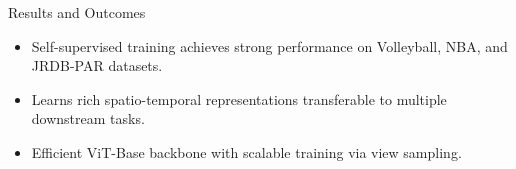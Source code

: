 \documentclass{beamer}
\begin{document}
\begin{frame}{Results and Outcomes}
    \begin{itemize}
        \item Self-supervised training achieves strong performance on Volleyball, NBA, and JRDB-PAR datasets.
        \item Learns rich spatio-temporal representations transferable to multiple downstream tasks.
        \item Efficient ViT-Base backbone with scalable training via view sampling.
    \end{itemize}
\end{frame}
\end{document}
